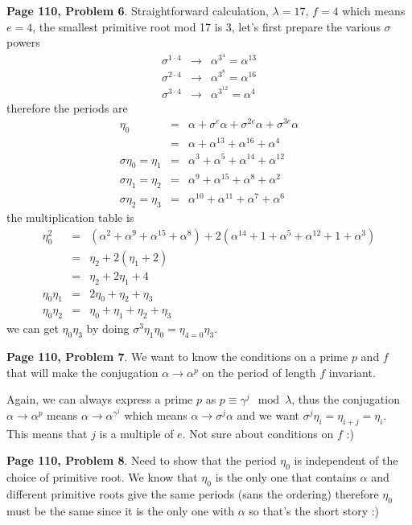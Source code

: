 \documentclass[aps,preprint,preprintnumbers,nofootinbib,showpacs,prd]{revtex4-1}
\newcommand{\nbea}{\begin{eqnarray*}}
\newcommand{\neea}{\end{eqnarray*}}
\begin{document}
{\bf Page 110, Problem 6}. Straightforward calculation, $\lambda = 17$, $f=4$ which means $e = 4$, the smallest primitive root mod 17 is 3, let's first prepare the various $\sigma$ powers
%
\nbea
\sigma^{1\cdot 4} & \to & \alpha^{3^4} = \alpha^{13} \\
\sigma^{2\cdot 4} & \to & \alpha^{3^8} = \alpha^{16} \\
\sigma^{3\cdot 4} & \to & \alpha^{3^{12}} = \alpha^4
\neea
% 
therefore the periods are
%
\nbea
\eta_0 & = & \alpha + \sigma^e \alpha + \sigma^{2e} \alpha + \sigma^{3e}\alpha \\
& = & \alpha + \alpha^{13} + \alpha^{16} + \alpha^{4} \\
\sigma \eta_0 = \eta_1 & = & \alpha^3 + \alpha^5 + \alpha^{14} + \alpha^{12} \\
\sigma \eta_1 = \eta_2 & = & \alpha^9 + \alpha^{15} + \alpha^{8} + \alpha^{2} \\
\sigma \eta_2 = \eta_3 & = & \alpha^{10} + \alpha^{11} + \alpha^{7} + \alpha^{6}
\neea
%
the multiplication table is
%
\nbea
\eta^2_0 & = & (\alpha^2 + \alpha^9 + \alpha^{15} + \alpha^{8}) + 2(\alpha^{14} + 1 + \alpha^{5} + \alpha^{12} + 1 + \alpha^{3}) \\
& = & \eta_2 + 2 (\eta_1 + 2) \\
& = & \eta_2 + 2\eta_1 + 4 \\
\eta_0\eta_1 & = & 2\eta_0 + \eta_2 + \eta_3 \\
\eta_0\eta_2 & = & \eta_0 + \eta_1 + \eta_2 + \eta_3
\neea
%
we can get $\eta_0\eta_3$ by doing $\sigma^{3} \eta_1\eta_0 = \eta_{4=0} \eta_3$.

{\bf Page 110, Problem 7}. We want to know the conditions on a prime $p$ and $f$ that will make the conjugation $\alpha \to \alpha^p$ on the period of length $f$ invariant.

Again, we can always express a prime $p$ as $p \equiv \gamma^j \mod{\lambda}$, thus the conjugation $\alpha \to \alpha^p$ means $\alpha \to \alpha^{\gamma^j}$ which means $\alpha \to \sigma^{j}\alpha$ and we want $\sigma^j \eta_i = \eta_{i+j} = \eta_i$. This means that $j$ is a multiple of $e$. Not sure about conditions on $f$ :)

{\bf Page 110, Problem 8}. Need to show that the period $\eta_0$ is independent of the choice of primitive root. We know that $\eta_0$ is the only one that contains $\alpha$ and different primitive roots give the same periods (sans the ordering) therefore $\eta_0$ must be the same since it is the only one with $\alpha$ so that's the short story :)
\end{document}

